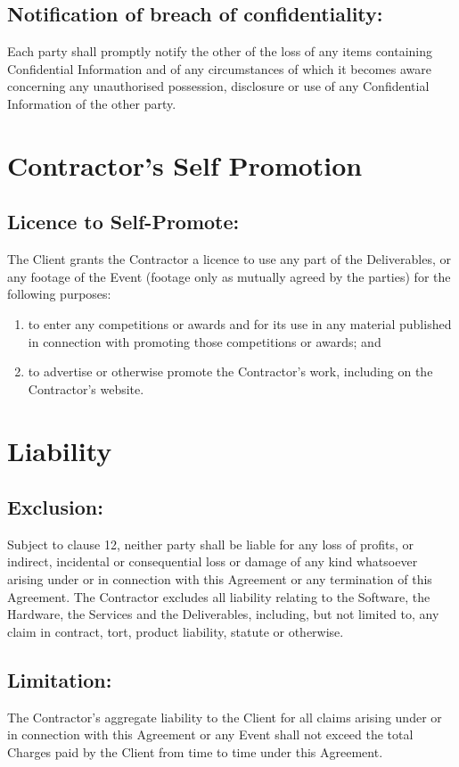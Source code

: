 \documentclass[a4paper,12pt]{article}
\begin{document}
\subsection{Notification of breach of confidentiality:}  Each party shall promptly notify the other of the loss of any items containing Confidential Information and of any circumstances of which it becomes aware concerning any unauthorised possession, disclosure or use of any Confidential Information of the other party.
\section{Contractor’s Self Promotion}
\subsection{Licence to Self-Promote:}  The Client grants the Contractor a licence to use any part of the Deliverables, or any footage of the Event (footage only as mutually agreed by the parties) for the following purposes:
\begin{enumerate}
\item to enter any competitions or awards and for its use in any material published in connection with promoting those competitions or awards; and
\item to advertise or otherwise promote the Contractor’s work, including on the Contractor’s website. 
\end{enumerate}

\section{Liability}
\subsection{Exclusion:}  Subject to clause 12, neither party shall be liable for any loss of profits, or indirect, incidental or consequential loss or damage of any kind whatsoever arising under or in connection with this Agreement or any termination of this Agreement.  The Contractor excludes all liability relating to the Software, the Hardware, the Services and the Deliverables, including, but not limited to, any claim in contract, tort, product liability, statute or otherwise.  
\subsection{Limitation:}  The Contractor’s aggregate liability to the Client for all claims arising under or in connection with this Agreement or any Event shall not exceed the total Charges paid by the Client from time to time under this Agreement.  
\end{document}
